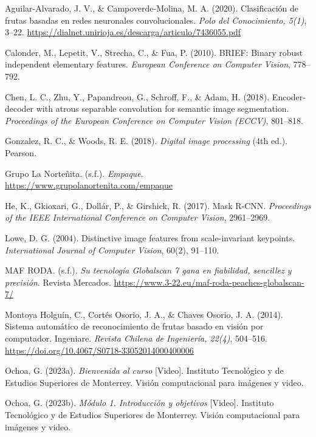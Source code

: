 \documentclass[12pt,letterpaper]{article}
\begin{document}
\begin{thebibliography}{99}

Aguilar-Alvarado, J. V., \& Campoverde-Molina, M. A. (2020). Clasificación de frutas basadas en redes neuronales convolucionales. \textit{Polo del Conocimiento, 5(1)}, 3–22. \url{https://dialnet.unirioja.es/descarga/articulo/7436055.pdf}

Calonder, M., Lepetit, V., Strecha, C., \& Fua, P. (2010). BRIEF: Binary robust independent elementary features. \textit{European Conference on Computer Vision}, 778--792.

Chen, L. C., Zhu, Y., Papandreou, G., Schroff, F., \& Adam, H. (2018). Encoder-decoder with atrous separable convolution for semantic image segmentation. \textit{Proceedings of the European Conference on Computer Vision (ECCV)}, 801--818.

Gonzalez, R. C., \& Woods, R. E. (2018). \textit{Digital image processing} (4th ed.). Pearson.

Grupo La Norteñita. (s.f.). \textit{Empaque}. \url{https://www.grupolanortenita.com/empaque}

He, K., Gkioxari, G., Dollár, P., \& Girshick, R. (2017). Mask R-CNN. \textit{Proceedings of the IEEE International Conference on Computer Vision}, 2961--2969.

Lowe, D. G. (2004). Distinctive image features from scale-invariant keypoints. \textit{International Journal of Computer Vision}, 60(2), 91--110.

MAF RODA. (s.f.). \textit{Su tecnología Globalscan 7 gana en fiabilidad, sencillez y precisión}. Revista Mercados. \url{https://www.3-22.eu/maf-roda-peaches-globalscan-7/}

Montoya Holguín, C., Cortés Osorio, J. A., \& Chaves Osorio, J. A. (2014). Sistema automático de reconocimiento de frutas basado en visión por computador. Ingeniare. \textit{Revista Chilena de Ingeniería, 22(4)}, 504–516. \url{https://doi.org/10.4067/S0718-33052014000400006}

Ochoa, G. (2023a). \textit{Bienvenida al curso} [Video]. Instituto Tecnológico y de Estudios Superiores de Monterrey. Visión computacional para imágenes y video.

Ochoa, G. (2023b). \textit{Módulo 1. Introducción y objetivos} [Video]. Instituto Tecnológico y de Estudios Superiores de Monterrey. Visión computacional para imágenes y video.


\end{thebibliography}
\end{document}
